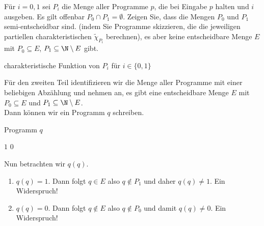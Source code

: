 
\begin{exercise}[224]
	Für $i = 0,1$ sei $P_i$ die Menge aller Programme $p$, die bei Eingabe $p$ halten und $i$ ausgeben. Es gilt offenbar $P_0 \cap P_1 = \emptyset$. Zeigen Sie, dass die Mengen $P_0$ und $P_1$ semi-entscheidbar sind. (indem Sie Programme skizzieren, die die jeweiligen partiellen charakteristischen $\tilde{\chi}_{P_i}$ berechnen), es aber keine entscheidbare Menge $E$ mit $P_0 \subseteq E$, $P_1 \subseteq \N \setminus E$ gibt.

\end{exercise}


\begin{solution}

\phantom{}

	\begin{algorithm}
		\caption{charakteristische Funktion von $P_i$ für $i \in \{0,1\}$}
		\begin{algorithmic}[1]
					\State {}
				\EndIf
			\EndProcedure
		\end{algorithmic}
	\end{algorithm}

	Für den zweiten Teil identifizieren wir die Menge aller Programme mit einer
	beliebigen Abzählung und nehmen an, es gibt eine entscheidbare Menge
	$E$ mit $P_0 \subseteq E$ und $P_1 \subseteq \N \setminus E$. \\
	Dann können wir ein Programm $q$ schreiben.

	\begin{algorithm}
		\caption{Programm $q$}
		\begin{algorithmic}[1]
			\Procedure{$q$}{$p$}
				\If{$\chi_E(p) = 1$}
					\State \Return $1$
				\Else
					\State \Return$0$
				\EndIf
			\EndProcedure
		\end{algorithmic}
	\end{algorithm}

	Nun betrachten wir $q(q)$.
	\begin{enumerate}[label = Fall \arabic*:]
		\item $q(q) = 1$. Dann folgt $q \in E$ also $q \notin P_1$ und daher $q(q) \neq 1$. Ein Widerspruch!

		\item $q(q) = 0$. Dann folgt $q \notin E$ also $q \notin P_0$ und damit $q(q) \neq 0$. Ein Widerspruch!
	\end{enumerate}
\end{solution}
